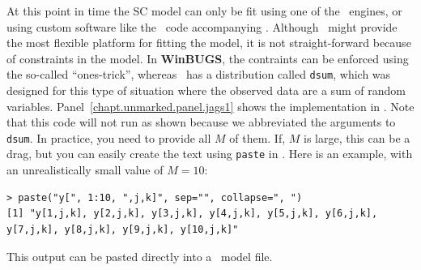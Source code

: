At this point in time the SC model can only be fit using one of the
\bugs~engines, or using custom software like the \R~code accompanying
\citet{chandler_royle:2012}. Although \bugs~might provide the most
flexible platform for fitting the model, it is not
straight-forward because of
constraints in the model. In \textbf{WinBUGS}, the contraints can be
enforced using the so-called ``ones-trick'', whereas \jags~has a distribution
called \verb+dsum+, which was designed for this type
of situation where the observed data are a sum of random
variables. %
Panel~\ref{chapt.unmarked.panel.jags1} shows the implementation in \jags.
Note that this code will not run as shown because we abbreviated the
arguments to \verb+dsum+. In practice, you need to provide all $M$ of
them. If, $M$ is large, this can be a drag, but you can easily create
the text using \verb+paste+ in \R. Here is an example, with an
unrealistically small value of $M=10$:
\begin{small}
\begin{verbatim}
> paste("y[", 1:10, ",j,k]", sep="", collapse=", ")
[1] "y[1,j,k], y[2,j,k], y[3,j,k], y[4,j,k], y[5,j,k], y[6,j,k],
y[7,j,k], y[8,j,k], y[9,j,k], y[10,j,k]"
\end{verbatim}
\end{small}
This output can be pasted directly into a \jags~model file.

